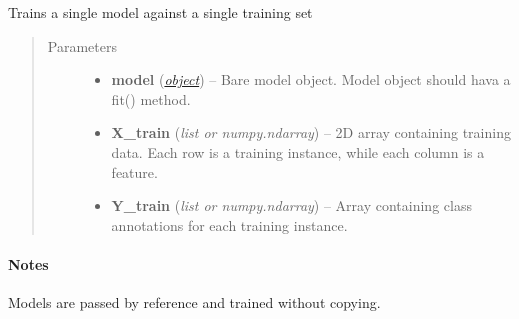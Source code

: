 \documentclass[letterpaper,10pt,english]{sphinxmanual}
\begin{document}
\begin{fulllineitems}
\label{classification:flamingo.classification.models.train_model}
Trains a single model against a single training set
\begin{quote}\begin{description}
\item[{Parameters}] \leavevmode\begin{itemize}
\item {} 
\textbf{model} (\href{http://docs.python.org/library/functions.html\#object}{\emph{object}}) -- Bare model object. Model object should hava a fit() method.

\item {} 
\textbf{X\_train} (\emph{list or numpy.ndarray}) -- 2D array containing training data. Each row is a training instance,
while each column is a feature.

\item {} 
\textbf{Y\_train} (\emph{list or numpy.ndarray}) -- Array containing class annotations for each training instance.

\end{itemize}

\end{description}\end{quote}
\paragraph{Notes}

Models are passed by reference and trained without copying.

\end{fulllineitems}

\end{document}
